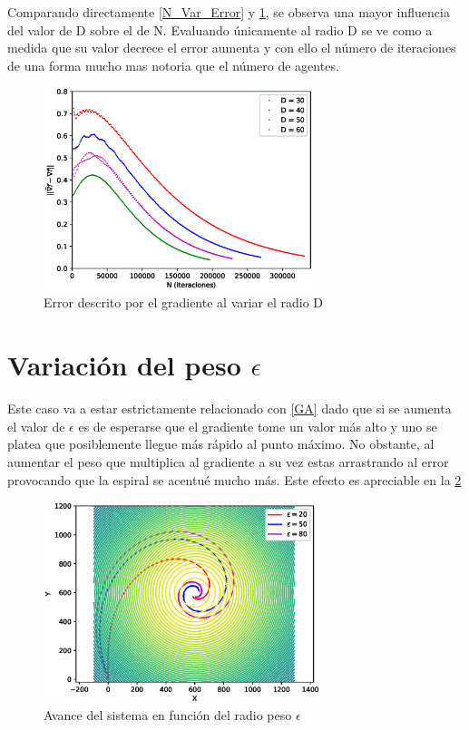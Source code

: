 Comparando directamente \ref{N_Var_Error} y \ref{D_Var_Error}, se observa una mayor influencia del valor de D sobre el de N. Evaluando únicamente al radio D se ve como a medida que su valor decrece el error aumenta y con ello el número de iteraciones de una forma mucho mas notoria que el número de agentes. 

\begin{figure}[H]
\centering
\includegraphics[width=0.70\textwidth]{figures/D_Var/D_variable.eps}
\caption{Error descrito por el gradiente al variar el radio D} \label{D_Var_Error}
\end{figure}

\section{Variación del peso $\epsilon$}

Este caso va a estar estrictamente relacionado con \ref{GA} dado que si se aumenta el valor de $\epsilon$ es de esperarse que el gradiente tome un valor más alto y uno se platea que posiblemente llegue más rápido al punto máximo. No obstante, al aumentar el peso que multiplica al gradiente a su vez estas arrastrando al error provocando que la espiral se acentué mucho más. Este efecto es apreciable en la \ref{Epsilon_Var}

\begin{figure}[H]
\centering
\includegraphics[width=0.72\textwidth]{figures/Epsilon_variante/Figure_1.eps}
\caption{Avance del sistema en función del radio peso $\epsilon$} \label{Epsilon_Var}
\end{figure}


